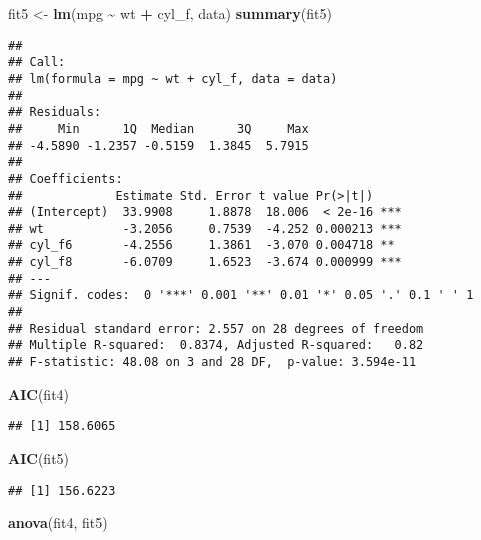 \documentclass[
  a4paper,
]{article}
\newenvironment{Shaded}{\begin{snugshade}}{\end{snugshade}}
\newcommand{\FunctionTok}[1]{\textcolor[rgb]{0.13,0.29,0.53}{\textbf{#1}}}
\newcommand{\NormalTok}[1]{#1}
\newcommand{\OtherTok}[1]{\textcolor[rgb]{0.56,0.35,0.01}{#1}}
\newcommand{\SpecialCharTok}[1]{\textcolor[rgb]{0.81,0.36,0.00}{\textbf{#1}}}
\begin{document}
\begin{Shaded}
\begin{Highlighting}[]
\NormalTok{fit5 }\OtherTok{\textless{}{-}} \FunctionTok{lm}\NormalTok{(mpg }\SpecialCharTok{\textasciitilde{}}\NormalTok{ wt }\SpecialCharTok{+}\NormalTok{ cyl\_f, data)}
\FunctionTok{summary}\NormalTok{(fit5)}
\end{Highlighting}
\end{Shaded}

\begin{verbatim}
## 
## Call:
## lm(formula = mpg ~ wt + cyl_f, data = data)
## 
## Residuals:
##     Min      1Q  Median      3Q     Max 
## -4.5890 -1.2357 -0.5159  1.3845  5.7915 
## 
## Coefficients:
##             Estimate Std. Error t value Pr(>|t|)    
## (Intercept)  33.9908     1.8878  18.006  < 2e-16 ***
## wt           -3.2056     0.7539  -4.252 0.000213 ***
## cyl_f6       -4.2556     1.3861  -3.070 0.004718 ** 
## cyl_f8       -6.0709     1.6523  -3.674 0.000999 ***
## ---
## Signif. codes:  0 '***' 0.001 '**' 0.01 '*' 0.05 '.' 0.1 ' ' 1
## 
## Residual standard error: 2.557 on 28 degrees of freedom
## Multiple R-squared:  0.8374, Adjusted R-squared:   0.82 
## F-statistic: 48.08 on 3 and 28 DF,  p-value: 3.594e-11
\end{verbatim}

\begin{Shaded}
\begin{Highlighting}[]
\FunctionTok{AIC}\NormalTok{(fit4)}
\end{Highlighting}
\end{Shaded}

\begin{verbatim}
## [1] 158.6065
\end{verbatim}

\begin{Shaded}
\begin{Highlighting}[]
\FunctionTok{AIC}\NormalTok{(fit5)}
\end{Highlighting}
\end{Shaded}

\begin{verbatim}
## [1] 156.6223
\end{verbatim}

\begin{Shaded}
\begin{Highlighting}[]
\FunctionTok{anova}\NormalTok{(fit4, fit5)}
\end{Highlighting}
\end{Shaded}
\end{document}
